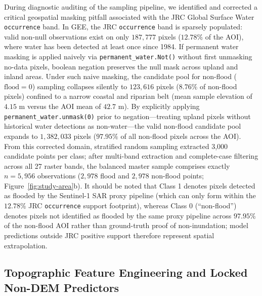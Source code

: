 \documentclass[11pt,twoside]{article}
\begin{document}
During diagnostic auditing of the sampling pipeline, we identified and corrected a critical geospatial masking pitfall associated with the JRC Global Surface Water \texttt{occurrence} band. In GEE, the JRC \texttt{occurrence} band is sparsely populated: valid non-null observations exist on only $187{,}777$ pixels ($12.78\%$ of the AOI), where water has been detected at least once since 1984. If permanent water masking is applied naively via \texttt{permanent\_water.Not()} without first unmasking no-data pixels, boolean negation preserves the null mask across upland and inland areas. Under such naive masking, the candidate pool for non-flood ($\text{flood}=0$) sampling collapses silently to $123{,}616$ pixels ($8.76\%$ of non-flood pixels) confined to a narrow coastal and riparian belt (mean sample elevation of $4.15\text{ m}$ versus the AOI mean of $42.7\text{ m}$). By explicitly applying \texttt{permanent\_water.unmask(0)} prior to negation---treating upland pixels without historical water detections as non-water---the valid non-flood candidate pool expands to $1{,}382{,}033$ pixels ($97.95\%$ of all non-flood pixels across the AOI). From this corrected domain, stratified random sampling extracted 3,000 candidate points per class; after multi-band extraction and complete-case filtering across all 27 raster bands, the balanced master sample comprises exactly $n = 5{,}956$ observations ($2{,}978$ flood and $2{,}978$ non-flood points; Figure~\ref{fig:study-area}b). It should be noted that Class 1 denotes pixels detected as flooded by the Sentinel-1 SAR proxy pipeline (which can only form within the $12.78\%$ JRC \texttt{occurrence} support footprint), whereas Class 0 (``non-flood'') denotes pixels not identified as flooded by the same proxy pipeline across $97.95\%$ of the non-flood AOI rather than ground-truth proof of non-inundation; model predictions outside JRC positive support therefore represent spatial extrapolation.

\subsection{Topographic Feature Engineering and Locked Non-DEM Predictors}\label{subsec:feature-engineering}
\end{document}
